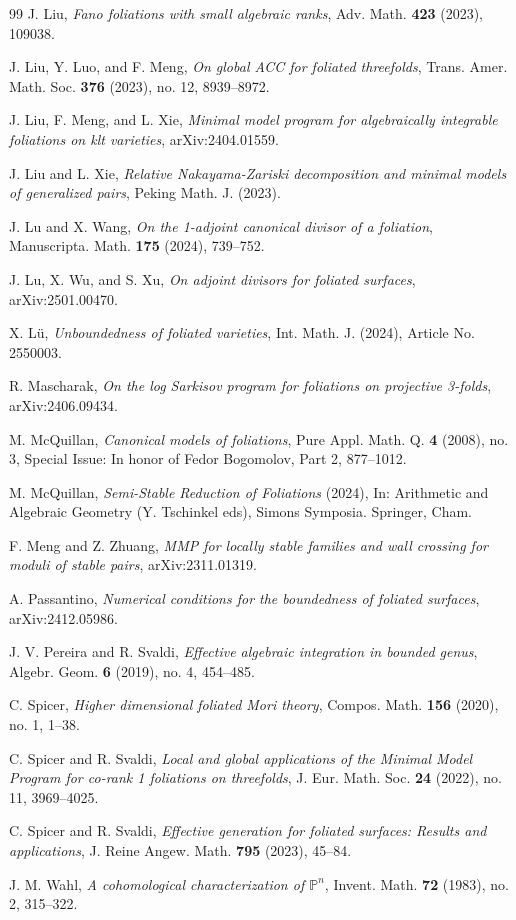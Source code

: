 \documentclass[12pt]{amsart}
\numberwithin{equation}{section}
\theoremstyle{definition}
\theoremstyle{definition}
\theoremstyle{definition}
\begin{document}
\begin{thebibliography}{99}
 J. Liu, \textit{Fano foliations with small algebraic ranks}, Adv. Math. \textbf{423} (2023), 109038.

 J. Liu, Y. Luo, and F. Meng, \textit{On global ACC for foliated threefolds},  Trans. Amer. Math. Soc. \textbf{376} (2023), no. 12, 8939--8972.

 J. Liu, F. Meng, and L. Xie, \textit{Minimal model program for algebraically integrable foliations on klt varieties}, arXiv:2404.01559.

 J. Liu and L. Xie, \textit{Relative Nakayama-Zariski decomposition and minimal models of generalized pairs}, Peking Math. J. (2023).

 J. Lu and X. Wang, \textit{On the 1-adjoint canonical divisor of a foliation}, Manuscripta. Math. \textbf{175} (2024), 739--752.

 J. Lu, X. Wu, and S. Xu, \textit{On adjoint divisors for foliated surfaces}, arXiv:2501.00470.

 X. Lü, \textit{Unboundedness of foliated varieties}, Int. Math. J. (2024), Article No. 2550003.

 R. Mascharak, \textit{On the log Sarkisov program for foliations on projective 3-folds}, arXiv:2406.09434.

 M. McQuillan, \textit{Canonical models of foliations}, Pure Appl. Math. Q. \textbf{4} (2008), no. 3, Special Issue: In honor of Fedor Bogomolov, Part 2, 877--1012.

 M. McQuillan, \textit{Semi-Stable Reduction of Foliations} (2024), In: Arithmetic and Algebraic Geometry (Y. Tschinkel eds), Simons Symposia. Springer, Cham.

 F. Meng and Z. Zhuang, \textit{MMP for locally stable families and wall crossing for moduli of stable pairs}, arXiv:2311.01319.

 A. Passantino, \textit{Numerical conditions for the boundedness of foliated surfaces}, arXiv:2412.05986.

 J. V. Pereira and R. Svaldi, \textit{Effective algebraic integration in bounded genus}, Algebr. Geom. \textbf{6} (2019), no. 4, 454--485.

 C. Spicer, \textit{Higher dimensional foliated Mori theory}, Compos. Math. \textbf{156} (2020), no. 1, 1--38.

 C. Spicer and R. Svaldi, \textit{Local and global applications of the Minimal Model Program for co-rank 1 foliations on threefolds}, J. Eur. Math. Soc. \textbf{24} (2022), no. 11, 3969--4025.


 C. Spicer and R. Svaldi, \textit{Effective generation for foliated surfaces: Results and applications}, J. Reine Angew. Math. \textbf{795} (2023), 45--84.

 J. M. Wahl, \textit{A cohomological characterization of $\mathbb P^n$}, Invent. Math. \textbf{72} (1983), no. 2, 315--322.

\end{thebibliography}
\end{document}
